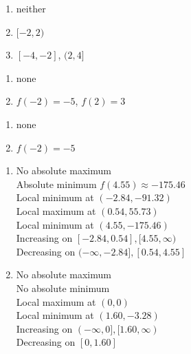 \begin{multicols}{3}
\begin{enumerate}
\setcounter{enumi}{\value{HW}}

\item  neither
\item  $[-2,2)$
\item  $[-4, -2]$, $(2,4]$

\setcounter{HW}{\value{enumi}}
\end{enumerate}
\end{multicols}

\begin{multicols}{2}
\begin{enumerate}
\setcounter{enumi}{\value{HW}}

\item  none
\item  $f(-2) = -5$, $f(2) = 3$

\setcounter{HW}{\value{enumi}}
\end{enumerate}
\end{multicols}

\begin{multicols}{2}
\begin{enumerate}
\setcounter{enumi}{\value{HW}}

\item  none
\item  $f(-2) = -5$

\setcounter{HW}{\value{enumi}}
\end{enumerate}
\end{multicols}

\begin{multicols}{2}
\begin{enumerate}
\setcounter{enumi}{\value{HW}}

\item No absolute maximum \\
Absolute minimum $f(4.55) \approx -175.46$ \\
Local minimum at $(-2.84, -91.32)$\\
Local maximum at $(0.54, 55.73)$ \\
Local minimum at $(4.55, -175.46)$\\
Increasing on $[-2.84, 0.54], [4.55, \infty)$\\
Decreasing on $(-\infty, -2.84], [0.54, 4.55]$

\item No absolute maximum \\
No absolute minimum \\
Local maximum at $(0, 0)$ \\
Local minimum at $(1.60, -3.28)$\\
Increasing on $(-\infty, 0], [1.60, \infty)$\\
Decreasing on $[0, 1.60]$

\setcounter{HW}{\value{enumi}}
\end{enumerate}
\end{multicols}

